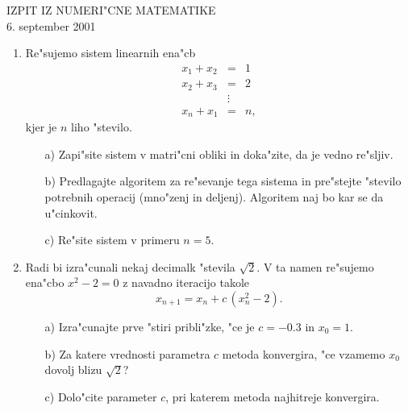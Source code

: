 \documentclass[12pt,a4paper]{article}
\begin{document}
\begin{center}
  IZPIT IZ NUMERI"CNE MATEMATIKE\\
  6. september 2001
\end{center}

\vspace{1.5cm}
\begin{enumerate}
 \item Re"sujemo sistem linearnih ena"cb
    \begin{eqnarray*}
      x_1+x_2 &=& 1\\
      x_2+x_3 &=& 2\\
              &\vdots&\\
      x_n+x_1 &=& n,
    \end{eqnarray*}
    kjer je $n$ liho "stevilo.
 \begin{itemize}
    \item[a)] Zapi"site sistem v matri"cni obliki in doka"zite,
      da je vedno re"sljiv.
    \item[b)] Predlagajte algoritem za re"sevanje tega sistema in
      pre"stejte "stevilo potrebnih operacij (mno"zenj in deljenj).
      Algoritem naj bo kar se da u"cinkovit.
    \item[c)] Re"site sistem v primeru $n=5$.
 \end{itemize}

 \item Radi bi izra"cunali nekaj decimalk "stevila 
        $\sqrt{2}$. V ta namen re"sujemo ena"cbo $x^2-2=0$
        z navadno iteracijo takole
        $$x_{n+1}=x_n+c\,(x_n^2-2).$$
 \begin{itemize}
      \item[a)] Izra"cunajte prve "stiri pribli"zke, "ce je
        $c=-0.3$ in $x_0=1$.
      \item[b)] Za katere vrednosti parametra $c$ metoda 
        konvergira, "ce vzamemo $x_0$ dovolj blizu $\sqrt{2}$?
      \item[c)] Dolo"cite parameter $c$, pri katerem metoda 
        najhitreje konvergira.
 \end{itemize}
\end{enumerate}
\end{document}
